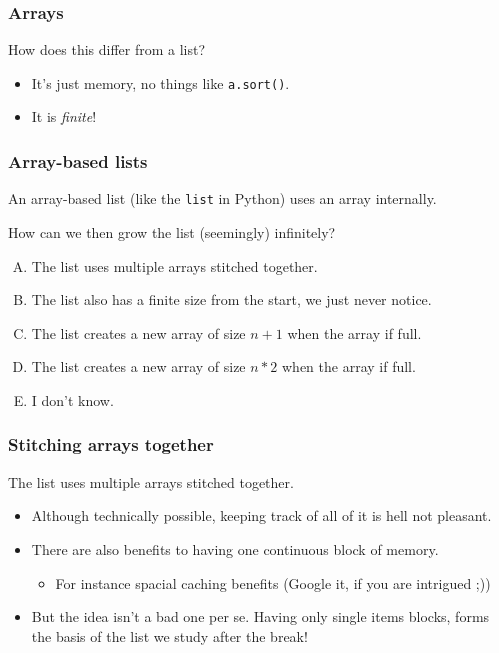 \begin{frame}
	\frametitle{Arrays}

	
			How does this differ from a list?

			\begin{itemize}
				\item It's just memory, no things like \texttt{a.sort()}.
				\item It is \textit{finite}!
			\end{itemize}

\end{frame}

\begin{frame}
	\frametitle{Array-based lists}

		An array-based list (like the \texttt{list} in Python) uses an array internally.

		How can we then grow the list (seemingly) infinitely?
		\begin{enumerate}[A.]
			\item The list uses multiple arrays stitched together.
			\item The list also has a finite size from the start, we just never notice.
			\item The list creates a new array of size $n+1$ when the array if full.
			\item The list creates a new array of size $n*2$ when the array if full.
			\item I don't know.
		\end{enumerate}

\end{frame}

\begin{frame}
	\frametitle{Stitching arrays together}
		The list uses multiple arrays stitched together.
		\begin{itemize}
			\item Although technically possible, keeping track of all of it is hell not pleasant.
			\item There are also benefits to having one continuous block of memory.
				\begin{itemize}
					\item For instance spacial caching benefits (Google it, if you are intrigued ;))
				\end{itemize}
				
			\item But the idea isn't a bad one per se. Having only single items blocks, forms the basis of the list we study
				after the break!
		\end{itemize}
\end{frame}

